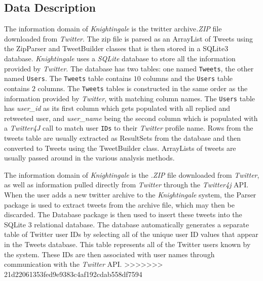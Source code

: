 \documentclass[a4paper, 12pt]{article}
\begin{document}
\subsection{Data Description} \label{sec:datadescript}
\begin{adjustwidth}{2em}{0pt}

The information domain of \textit{Knightingale} is the  twitter archive\textit{.ZIP} file downloaded from \textit{Twitter}. The zip file is parsed as an ArrayList of Tweets using the ZipParser and TweetBuilder classes that is then stored in a SQLite3 database. 
\textit{Knightingale} uses a \textit{SQLite} database to store all the information provided by \textit{Twitter}. The database has two tables: one named \texttt{Tweets}, the other named \texttt{Users}. The \texttt{Tweets} table contains $10$ columns and the \texttt{Users} table contains $2$ columns. The \texttt{Tweets} tables is constructed in the same order as the information provided by \textit{Twitter}, with matching column names. The \texttt{Users} table has \textit{user\_id} as its first column which gets populated with all replied and retweeted user, and \textit{user\_name} being the second column which is populated with a \textit{Twitter4J} call to match user \texttt{IDs} to their \textit{Twitter} profile name. Rows from the tweets table are usually extracted as ResultSets from the database and then converted to Tweets using the TweetBuilder class. ArrayLists of tweets are usually passed around in the various analysis methods.

The information domain of \textit{Knightingale} is the \textit{.ZIP} file downloaded from \textit{Twitter}, as well as information pulled directly from \textit{Twitter} through the \textit{Twitter4j} API. When the user adds a new twitter archive to the \textit{Knightingale} system, the Parser package is used to extract tweets from the archive file, which may then be discarded. The Database package is then used to insert these tweets into the SQLite 3 relational database. The database automatically generates a separate table of Twitter user IDs by selecting all of the unique user ID values that appear in the Tweets database. This table represents all of the Twitter users known by the system. These IDs are then associated with  user names through communication with the \textit{Twitter} API.
>>>>>>> 21d22061353fed9e9383c4af192cdab558df7594
\end{adjustwidth}
\end{document}
